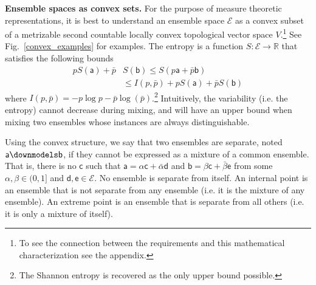 \documentclass[10pt,twocolumn, nofootinbib]{revtex4-2}
\newcommand{\ens}[1][e] {\mathsf{#1}} %
\newcommand{\Ens}[1][E] {\mathcal{#1}} %
\def\separate{\downmodels}
\begin{document}

\textbf{Ensemble spaces as convex sets.} For the purpose of measure theoretic representations, it is best to understand an ensemble space $\Ens$ as a convex subset of a metrizable second countable locally convex topological vector space $V$.\footnote{To see the connection between the requirements and this mathematical characterization see the appendix.} See Fig.~\ref{convex_examples} for examples. The entropy is a function $S : \Ens \to \mathbb{R}$ that satisfies the following bounds
\begin{equation}
	\begin{aligned}
		p S(\ens[a]) + \bar{p} &S(\ens[b]) \leq S(p \ens[a] + \bar{p} \ens[b]) \\
		&\leq I(p,\bar{p}) + p S(\ens[a]) + \bar{p} S(\ens[b])
	\end{aligned}
\end{equation}
where $I(p,\bar{p}) = - p \log p - \bar{p} \log(\bar{p})$.\footnote{The Shannon entropy is recovered as the only upper bound possible.}  Intuitively, the variability (i.e. the entropy) cannot decrease during mixing, and will have an upper bound when mixing two ensembles whose instances are always distinguishable.

Using the convex structure, we say that two ensembles are separate, noted $\ens[a] \separate \ens[b]$, if they cannot be expressed as a mixture of a common ensemble. That is, there is no $\ens[c]$ such that $\ens[a] = \alpha \ens[c] + \bar{\alpha} \ens[d]$ and $\ens[b] = \beta \ens[c] + \bar{\beta} \ens$ from some $\alpha, \beta \in (0,1]$ and $\ens[d],\ens \in \Ens$. No ensemble is separate from itself. An internal point is an ensemble that is not separate from any ensemble (i.e. it is the mixture of any ensemble). An extreme point is an ensemble that is separate from all others (i.e. it is only a mixture of itself).
\end{document}

